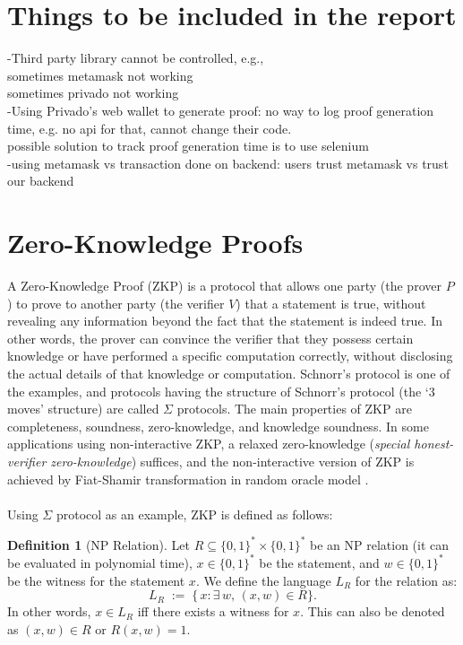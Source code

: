 \documentclass[12pt]{article}
\date{13th Dec 2024}
\theoremstyle{definition}
\newtheorem{definition}{Definition}[section]
\begin{document}

\tableofcontents
\newpage
\section{Things to be included in the report} \label{Introduction}
-Third party library cannot be controlled, e.g., \\
sometimes metamask not working\\
sometimes privado not working\\
-Using Privado's web wallet to generate proof: no way to log proof generation time, e.g. no api for that, cannot change their code.\\
possible solution to track proof generation time is to use selenium\\
-using metamask vs transaction done on backend: users trust metamask vs trust our backend

\section{Zero-Knowledge Proofs}\label{sec:zkp}
A Zero-Knowledge Proof (ZKP) \cite{zkp85} is a protocol that allows one party (the prover $P$) to prove to another party (the verifier $V$) that a statement is true, without revealing any information beyond the fact that the statement is indeed true. In other words, the prover can convince the verifier that they possess certain knowledge or have performed a specific computation correctly, without disclosing the actual details of that knowledge or computation. Schnorr's protocol is one of the examples, and protocols having the structure of Schnorr's protocol (the `3 moves' structure) are called $\Sigma$ protocols. The main properties of ZKP are completeness, soundness, zero-knowledge, and knowledge soundness. In some applications using non-interactive ZKP, a relaxed zero-knowledge (\textit{special honest-verifier zero-knowledge}) suffices, and the non-interactive version of ZKP is achieved by Fiat-Shamir transformation \cite{FS} in random oracle model \cite{RO}.\\
\\
Using $\Sigma$ protocol as an example, ZKP is defined as follows:\\
\begin{definition}[NP Relation]
Let \(R \subseteq \{0,1\}^* \times \{0,1\}^*\) be an NP relation (it can be evaluated in polynomial time), $x \in \{0,1\}^*$ be the statement, and $w\in\{0,1\}^*$ be the witness for the statement $x$. We define the language $L_R$ for the relation as:
\[
 L_R \;:=\; \{\,x : \exists\,w,\,(x,w)\in R\}.
\]
In other words, $x \in L_R$ iff there exists a witness for $x$. This can also be denoted as $(x,w)\in R$ or $R(x,w)=1$.
\end{definition}
\end{document}
